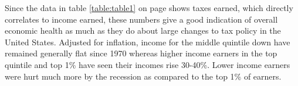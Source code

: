 \documentclass{article}\usepackage[]{graphicx}\usepackage[]{color}
\begin{document}
Since the data in table \ref{table:table1} on page \pageref{table:table1} shows taxes earned, which directly correlates to income earned, these numbers give a good indication of overall economic health as much as they do about large changes to tax policy in the United States. Adjusted for inflation, income for the middle quintile down have remained generally flat since 1970 whereas higher income earners in the top quintile and top 1\% have seen their incomes rise 30-40\%. Lower income earners were hurt much more by the recession as compared to the top 1\% of earners.
\end{document}
